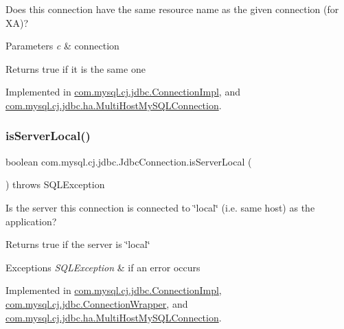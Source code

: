 Does this connection have the same resource name as the given connection (for XA)?


\begin{DoxyParams}{Parameters}
{\em c} & connection \\
\hline
\end{DoxyParams}
\begin{DoxyReturn}{Returns}
true if it is the same one 
\end{DoxyReturn}


Implemented in \mbox{\hyperlink{classcom_1_1mysql_1_1cj_1_1jdbc_1_1_connection_impl_a0eec8abab54aa4e2f6789b0d3db561e4}{com.\+mysql.\+cj.\+jdbc.\+Connection\+Impl}}, and \mbox{\hyperlink{classcom_1_1mysql_1_1cj_1_1jdbc_1_1ha_1_1_multi_host_my_s_q_l_connection_a47d81e605bf65122771ecb727b6177ed}{com.\+mysql.\+cj.\+jdbc.\+ha.\+Multi\+Host\+My\+S\+Q\+L\+Connection}}.

\mbox{\label{interfacecom_1_1mysql_1_1cj_1_1jdbc_1_1_jdbc_connection_a4418f89cdbd768f892b6ef7823107921}} 
\subsubsection{\texorpdfstring{is\+Server\+Local()}{isServerLocal()}}
{\footnotesize\ttfamily boolean com.\+mysql.\+cj.\+jdbc.\+Jdbc\+Connection.\+is\+Server\+Local (\begin{DoxyParamCaption}{ }\end{DoxyParamCaption}) throws S\+Q\+L\+Exception}

Is the server this connection is connected to \char`\"{}local\char`\"{} (i.\+e. same host) as the application?

\begin{DoxyReturn}{Returns}
true if the server is \char`\"{}local\char`\"{} 
\end{DoxyReturn}

\begin{DoxyExceptions}{Exceptions}
{\em S\+Q\+L\+Exception} & if an error occurs \\
\hline
\end{DoxyExceptions}


Implemented in \mbox{\hyperlink{classcom_1_1mysql_1_1cj_1_1jdbc_1_1_connection_impl_a9f0926c4f30516633878b4315f7c073c}{com.\+mysql.\+cj.\+jdbc.\+Connection\+Impl}}, \mbox{\hyperlink{classcom_1_1mysql_1_1cj_1_1jdbc_1_1_connection_wrapper_afe8fab04e181ccd81e0e5bb3881361cd}{com.\+mysql.\+cj.\+jdbc.\+Connection\+Wrapper}}, and \mbox{\hyperlink{classcom_1_1mysql_1_1cj_1_1jdbc_1_1ha_1_1_multi_host_my_s_q_l_connection_ae6f52873381a19395473dd957c756ee7}{com.\+mysql.\+cj.\+jdbc.\+ha.\+Multi\+Host\+My\+S\+Q\+L\+Connection}}.

